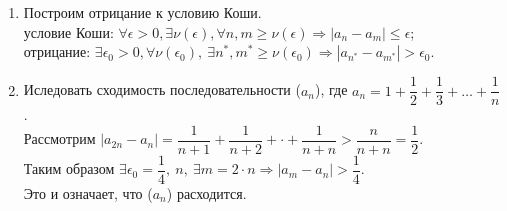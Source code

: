 \begin{example}
	\begin{enumerate}
		\item Построим отрицание к условию Коши.\\
		условие Коши: $\forall \epsilon > 0, \exists \nu(\epsilon) , \forall n,m \ge \nu(\epsilon) \Rightarrow |a_n - a_m| \le \epsilon$;\\
		отрицание: $\exists \epsilon_0 > 0, \forall \nu({\epsilon_0}),\ \exists n^*,m^* \ge \nu({\epsilon_0}) \Rightarrow |a_{n^*} - a_{m^*}| > \epsilon_0$.\\
		\item Иследовать сходимость последовательности ($a_n$), где $a_n = 1 + \dfrac{1}{2} + \dfrac{1}{3} + \dots + \dfrac{1}{n}$.\\
		Рассмотрим $|a_{2n} - a_n| = \dfrac{1}{n + 1} + \dfrac{1}{n + 2} + \cdot + \dfrac{1}{n + n} > \dfrac{n}{n + n} = \dfrac{1}{2}$.\\
		Таким образом 
		$\exists \epsilon_0 = \dfrac{1}{4},\ n,\ \exists m = 2\cdot n \Rightarrow |a_m - a_n| > \dfrac{1}{4}.$\\
		Это и означает, что ($a_n$) расходится.
	\end{enumerate}
\end{example}  
